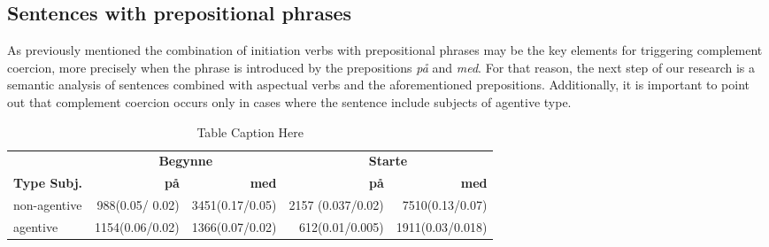 \documentclass{article}
\begin{document}
\subsection{Sentences with prepositional phrases}
As previously mentioned the combination of initiation verbs with prepositional phrases may be the key elements for triggering complement coercion, more precisely when the phrase is introduced by the prepositions \emph{på} and \emph{med}. %
For that reason, the next step of our research is a semantic analysis of sentences combined with aspectual verbs and the aforementioned prepositions. Additionally, it is important to point out that complement coercion occurs only in cases where the sentence include subjects of agentive type. 
\begin{table}[!]
    \centering
    \begin{tabular}{lrrrr}
        \toprule
        & \multicolumn{2}{c}{\textbf{Begynne}} & \multicolumn{2}{c}{\textbf{Starte}} \\
        \cmidrule(lr){2-3} \cmidrule(lr){4-5}
        \textbf{Type Subj.} & \textbf{på} & \textbf{med} & \textbf{på} & \textbf{med} \\
        \midrule
        non-agentive &   988(0.05/ 0.02) & 3451(0.17/0.05) & 2157	(0.037/0.02) & 7510(0.13/0.07)\\
        agentive      &  1154(0.06/0.02) & 1366(0.07/0.02)  & 612(0.01/0.005) &  1911(0.03/0.018) \\
        \bottomrule
    \end{tabular}
    \caption{Table Caption Here}
    \label{tab:initiation_verbs_agentive_no_agentive}
\end{table}
\end{document}
